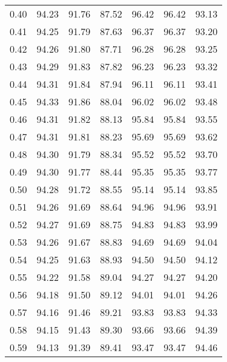 \begin{tabular}{|c|c|c|c|c|c|c|}
      0.40 &     94.23 &     91.76 &      87.52 &   96.42 &      96.42 &         93.13 \\
      0.41 &     94.25 &     91.79 &      87.63 &   96.37 &      96.37 &         93.20 \\
      0.42 &     94.26 &     91.80 &      87.71 &   96.28 &      96.28 &         93.25 \\
      0.43 &     94.29 &     91.83 &      87.82 &   96.23 &      96.23 &         93.32 \\
      0.44 &     94.31 &     91.84 &      87.94 &   96.11 &      96.11 &         93.41 \\
      0.45 &     94.33 &     91.86 &      88.04 &   96.02 &      96.02 &         93.48 \\
      0.46 &     94.31 &     91.82 &      88.13 &   95.84 &      95.84 &         93.55 \\
      0.47 &     94.31 &     91.81 &      88.23 &   95.69 &      95.69 &         93.62 \\
      0.48 &     94.30 &     91.79 &      88.34 &   95.52 &      95.52 &         93.70 \\
      0.49 &     94.30 &     91.77 &      88.44 &   95.35 &      95.35 &         93.77 \\
      0.50 &     94.28 &     91.72 &      88.55 &   95.14 &      95.14 &         93.85 \\
      0.51 &     94.26 &     91.69 &      88.64 &   94.96 &      94.96 &         93.91 \\
      0.52 &     94.27 &     91.69 &      88.75 &   94.83 &      94.83 &         93.99 \\
      0.53 &     94.26 &     91.67 &      88.83 &   94.69 &      94.69 &         94.04 \\
      0.54 &     94.25 &     91.63 &      88.93 &   94.50 &      94.50 &         94.12 \\
      0.55 &     94.22 &     91.58 &      89.04 &   94.27 &      94.27 &         94.20 \\
      0.56 &     94.18 &     91.50 &      89.12 &   94.01 &      94.01 &         94.26 \\
      0.57 &     94.16 &     91.46 &      89.21 &   93.83 &      93.83 &         94.33 \\
      0.58 &     94.15 &     91.43 &      89.30 &   93.66 &      93.66 &         94.39 \\
      0.59 &     94.13 &     91.39 &      89.41 &   93.47 &      93.47 &         94.46 \\

\end{tabular}
